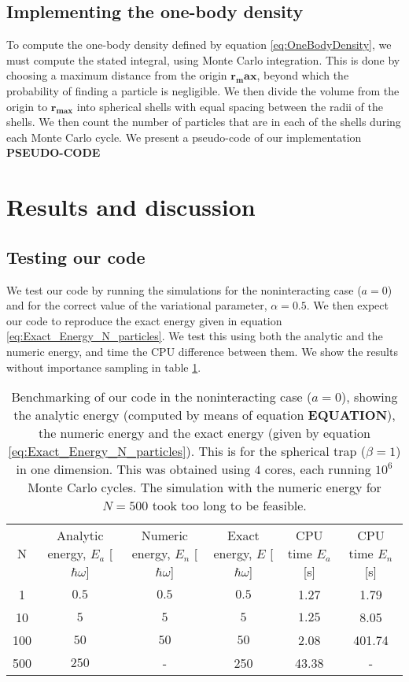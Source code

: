 \documentclass[a4paper, 10pt]{article}
\begin{document}
	\subsection{Implementing the one-body density}\label{sec:MetOneBody}
	To compute the one-body density defined by equation \ref{eq:OneBodyDensity}, we must compute the stated integral, using Monte Carlo integration. This is done by choosing a maximum distance from the origin $\boldsymbol{r_max}$, beyond which the probability of finding a particle is negligible. We then divide the volume from the origin to $\boldsymbol{r_{max}}$ into spherical shells with equal spacing between the radii of the shells. We then count the number of particles that are in each of the shells during each Monte Carlo cycle. We present a pseudo-code of our implementation \textbf{PSEUDO-CODE}	
	
	\section{Results and discussion}
	\subsection{Testing our code}
	We test our code by running the simulations for the noninteracting case ($a=0$) and for the correct value of the variational parameter, $\alpha=0.5$. We then expect our code to reproduce the exact energy given in equation \ref{eq:Exact_Energy_N_particles}. We test this using both the analytic and the numeric energy, and time the CPU difference between them. We show the results without importance sampling in table \ref{tab:4.1_benchmark_no_Green}.
	\begin{table}[ht!]
		\begin{adjustwidth}{-2cm}{}
			\begin{tabular}{cccccc}
				N & Analytic energy, $E_a$ [$\hbar \omega$] & Numeric energy, $E_n$ [$\hbar \omega$] & Exact energy, $E$ [$\hbar \omega$]& CPU time $E_a$ [s] &CPU time $E_n$ [s]\\
				1&$0.5$&$0.5$&$0.5$& 1.27&1.79\\
				10&$5$&$5$&$5$& $1.25$&8.05\\
				100&$50$&$50$&$50$&2.08&401.74\\
				500&$250$&-&250 &43.38 &-
			\end{tabular}
		\end{adjustwidth}
		\caption{Benchmarking of our code in the noninteracting case ($a=0$), showing the analytic energy (computed by means of equation \textbf{EQUATION}), the numeric energy and the exact energy (given by equation \ref{eq:Exact_Energy_N_particles}). This is for the spherical trap ($\beta=1$) in one dimension. This was obtained using $4$ cores, each running $10^6$ Monte Carlo cycles. The simulation with the numeric energy for $N=500$ took too long to be feasible.}\label{tab:4.1_benchmark_no_Green}
	\end{table}
	
\end{document}
